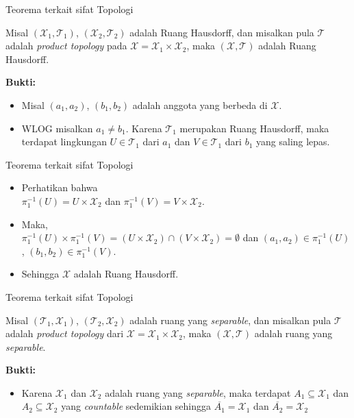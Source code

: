 \begin{frame}{Teorema terkait sifat Topologi}
    \begin{tcolorbox}[enhanced,title=Teorema 2.23,frame style tile = {width=\paperwidth}{wallpaper}]
        Misal $(\mathcal{X}_{1},\mathcal{T}_1)$, $(\mathcal{X}_2,\mathcal{T}_2)$ adalah Ruang Hausdorff, dan misalkan pula $\mathcal{T}$ adalah \textit{product topology} pada $\mathcal{X}=\mathcal{X}_1\times\mathcal{X}_2$, maka $(\mathcal{X},\mathcal{T})$ adalah Ruang Hausdorff.
    \end{tcolorbox}
        \textbf{Bukti:}
        \begin{itemize}
            \item Misal $(a_1,a_2)$, $(b_1,b_2)$ adalah anggota yang berbeda di $\mathcal{X}$. 
            \item WLOG misalkan $a_1\neq b_1$. Karena $\mathcal{T}_1$ merupakan Ruang Hausdorff, maka terdapat lingkungan $U\in\mathcal{T}_1$ dari $a_1$ dan $V\in\mathcal{T}_1$ dari $b_1$ yang saling lepas.
        \end{itemize}
    \end{frame}
    
    \begin{frame}{Teorema terkait sifat Topologi}
        \begin{itemize}
            \item Perhatikan bahwa\\ $\pi_1^{-1}(U) = U\times\mathcal{X}_2$ dan $\pi_1^{-1}(V) = V\times\mathcal{X}_2$.
            \item Maka,\\ $\pi_1^{-1}(U)\times\pi_1^{-1}(V) = (U\times\mathcal{X}_2)\cap( V\times\mathcal{X}_2) = \emptyset$ dan $(a_1,a_2)\in\pi_1^{-1}(U)$, $(b_1,b_2)\in\pi_1^{-1}(V)$.
            \item Sehingga $\mathcal{X}$ adalah Ruang Hausdorff.
        \end{itemize}
    \end{frame}
    
    \begin{frame}{Teorema terkait sifat Topologi}
    \begin{tcolorbox}[enhanced,title=Teorema 2.24,frame style tile={width=\paperwidth}{wallpaper}]
        Misal $(\mathcal{T}_1,\mathcal{X}_1)$, $(\mathcal{T}_2,\mathcal{X}_2)$ adalah ruang yang \textit{separable}, dan misalkan pula $\mathcal{T}$ adalah \textit{product topology} dari $\mathcal{X}=\mathcal{X}_1\times\mathcal{X}_2$, maka $(\mathcal{X},\mathcal{T})$ adalah ruang yang \textit{separable}.
    \end{tcolorbox}
    \textbf{Bukti:}
    \begin{itemize}
        \item Karena $\mathcal{X}_1$ dan $\mathcal{X}_2$ adalah ruang yang \textit{separable}, maka terdapat $A_1\subseteq\mathcal{X}_1$ dan $A_2\subseteq\mathcal{X}_2$ yang \textit{countable} sedemikian sehingga $\overline{A_1}=\mathcal{X}_1$ dan $\overline{A_2}=\mathcal{X}_2$
    \end{itemize}
    \end{frame}
    
